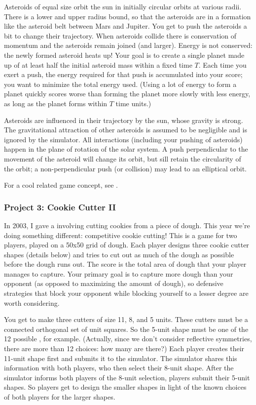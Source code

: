 Asteroids of equal size orbit the sun in initially circular orbits at
various radii.  There is a lower and upper radius bound, so that
the asteroids are in a formation like the asteroid belt between
Mars and Jupiter.  You get to
push the asteroids a bit to change their trajectory.  When asteroids
collide there is conservation of momentum and the asteroids remain
joined (and larger).  Energy is not conserved: the newly formed
asteroid heats up!  Your goal is to create a single planet made up of at
least half the initial asteroid mass within a fixed time $T$.  Each
time you exert a push, the energy required for that push is
accumulated into your score; you want to minimize the total energy
used. (Using a lot of energy to form a planet quickly scores worse
than forming the planet more slowly with less energy, as long as the
planet forms within $T$ time units.)

Asteroids are influenced in their trajectory by the sun, whose gravity
is strong.  The gravitational attraction of other asteroids is assumed
to be negligible and is ignored by the simulator.  All interactions
(including your pushing of asteroids) happen in the plane of rotation
of the solar system.  A push perpendicular to the movement of the
asteroid will change its orbit, but sill retain the circularity of the
orbit; a non-perpendicular push (or collision) may lead to an
elliptical orbit.

For a cool related game concept, see .
\subsubsection{Project 3: Cookie Cutter II}

In 2003, I gave a 
involving cutting cookies from a piece of dough.  This year we're doing something different: competitive
cookie cutting!  This is a game for two players, played on a 50x50 grid of dough.  Each player designs three
cookie cutter shapes (details below) and tries to cut out as much of the dough as possible before the
dough runs out.  The score is the total area of dough that your player manages to capture.  Your primary
goal is to capture more dough than your opponent (as opposed to maximizing the amount of dough), so
defensive strategies that block your opponent while blocking yourself to a lesser degree are worth
considering.

You get to make three cutters of size 11, 8, and 5 units.  These
cutters must be a connected orthogonal set of unit squares.  So the 5-unit
shape must be one of the 12 possible
,
for example. (Actually, since we don't consider reflective symmetries, there
are more than 12 choices: how many are there?)  Each player creates their 11-unit shape first and
submits it to the simulator.  The simulator shares this information
with both players, who then select their 8-unit shape.  After the
simulator informs both players of the 8-unit selection, players submit
their 5-unit shapes.  So players get to design the smaller shapes in
light of the known choices of both players for the larger shapes.

